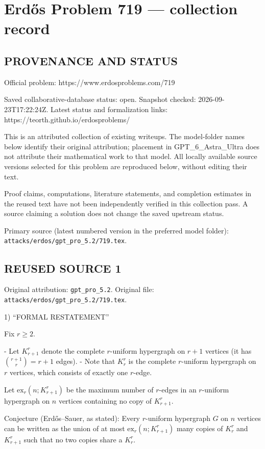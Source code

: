 \section*{Erd\H{o}s Problem 719 --- collection record}

\subsection*{PROVENANCE AND STATUS}
Official problem: https://www.erdosproblems.com/719

Saved collaborative-database status: open.
Snapshot checked: 2026-09-23T17:22:24Z.
Latest status and formalization links: https://teorth.github.io/erdosproblems/

This is an attributed collection of existing writeups. The model-folder names below identify their original attribution; placement in GPT\_6\_Astra\_Ultra does not attribute their mathematical work to that model. All locally available source versions selected for this problem are reproduced below, without editing their text.

Proof claims, computations, literature statements, and completion estimates in the reused text have not been independently verified in this collection pass. A source claiming a solution does not change the saved upstream status.

Primary source (latest numbered version in the preferred model folder): \texttt{attacks/erdos/gpt\_pro\_5.2/719.tex}.

\subsection*{REUSED SOURCE 1}
Original attribution: \texttt{gpt\_pro\_5.2}.
Original file: \texttt{attacks/erdos/gpt\_pro\_5.2/719.tex}.


1) “FORMAL RESTATEMENT”

Fix $r\ge 2$.

- Let $K_{r+1}^r$ denote the complete $r$-uniform hypergraph on $r+1$ vertices (it has $\binom{r+1}{r}=r+1$ edges).
- Note that $K_r^r$ is the complete $r$-uniform hypergraph on $r$ vertices, which consists of exactly one $r$-edge.

Let $\mathrm{ex}_r(n;K_{r+1}^r)$ be the maximum number of $r$-edges in an $r$-uniform hypergraph on $n$ vertices containing no copy of $K_{r+1}^r$.

Conjecture (Erd\H{o}s--Sauer, as stated): Every $r$-uniform hypergraph $G$ on $n$ vertices can be written as the union of at most $\mathrm{ex}_r(n;K_{r+1}^r)$ many copies of $K_r^r$ and $K_{r+1}^r$ such that no two copies share a $K_r^r$.

